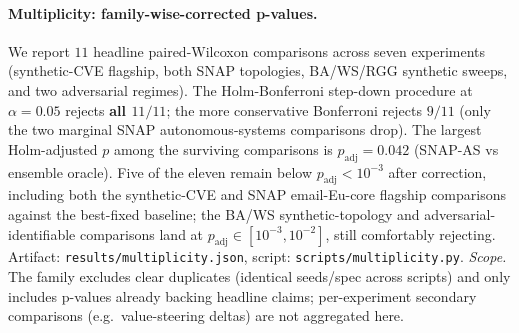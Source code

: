\documentclass[11pt]{article}
\begin{document}
\paragraph{Multiplicity: family-wise-corrected p-values.}
We report $11$ headline paired-Wilcoxon comparisons across seven experiments
(synthetic-CVE flagship, both SNAP topologies, BA/WS/RGG synthetic sweeps, and
two adversarial regimes). The Holm-Bonferroni step-down procedure at $\alpha{=}
0.05$ rejects \textbf{all $11/11$}; the more conservative Bonferroni rejects
$9/11$ (only the two marginal SNAP autonomous-systems comparisons drop). The
largest Holm-adjusted $p$ among the surviving comparisons is $p_\text{adj}{=}
0.042$ (SNAP-AS vs ensemble oracle). Five of the eleven remain below
$p_\text{adj}{<}10^{-3}$ after correction, including both the synthetic-CVE
and SNAP email-Eu-core flagship comparisons against the best-fixed baseline;
the BA/WS synthetic-topology and adversarial-identifiable comparisons land at
$p_\text{adj}\!\in\![10^{-3},10^{-2}]$, still comfortably rejecting. Artifact:
\texttt{results/multiplicity.json}, script: \texttt{scripts/multiplicity.py}.
\emph{Scope.} The family excludes clear duplicates (identical seeds/spec
across scripts) and only includes p-values already backing headline claims;
per-experiment secondary comparisons (e.g.\ value-steering deltas) are not
aggregated here.



\end{document}
